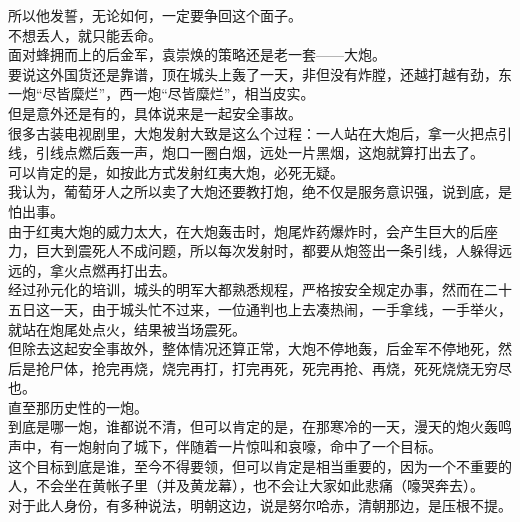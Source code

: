 \begin{multicols}{\theparacolNo}
所以他发誓，无论如何，一定要争回这个面子。\\

不想丢人，就只能丢命。\\

面对蜂拥而上的后金军，袁崇焕的策略还是老一套——大炮。\\

要说这外国货还是靠谱，顶在城头上轰了一天，非但没有炸膛，还越打越有劲，东一炮“尽皆糜烂”，西一炮“尽皆糜烂”，相当皮实。\\

但是意外还是有的，具体说来是一起安全事故。\\

很多古装电视剧里，大炮发射大致是这么个过程：一人站在大炮后，拿一火把点引线，引线点燃后轰一声，炮口一圈白烟，远处一片黑烟，这炮就算打出去了。\\

可以肯定的是，如按此方式发射红夷大炮，必死无疑。\\

我认为，葡萄牙人之所以卖了大炮还要教打炮，绝不仅是服务意识强，说到底，是怕出事。\\

由于红夷大炮的威力太大，在大炮轰击时，炮尾炸药爆炸时，会产生巨大的后座力，巨大到震死人不成问题，所以每次发射时，都要从炮签出一条引线，人躲得远远的，拿火点燃再打出去。\\

经过孙元化的培训，城头的明军大都熟悉规程，严格按安全规定办事，然而在二十五日这一天，由于城头忙不过来，一位通判也上去凑热闹，一手拿线，一手举火，就站在炮尾处点火，结果被当场震死。\\

但除去这起安全事故外，整体情况还算正常，大炮不停地轰，后金军不停地死，然后是抢尸体，抢完再烧，烧完再打，打完再死，死完再抢、再烧，死死烧烧无穷尽也。\\

直至那历史性的一炮。\\

到底是哪一炮，谁都说不清，但可以肯定的是，在那寒冷的一天，漫天的炮火轰鸣声中，有一炮射向了城下，伴随着一片惊叫和哀嚎，命中了一个目标。\\

这个目标到底是谁，至今不得要领，但可以肯定是相当重要的，因为一个不重要的人，不会坐在黄帐子里（并及黄龙幕），也不会让大家如此悲痛（嚎哭奔去）。\\

对于此人身份，有多种说法，明朝这边，说是努尔哈赤，清朝那边，是压根不提。\\


\end{multicols}
